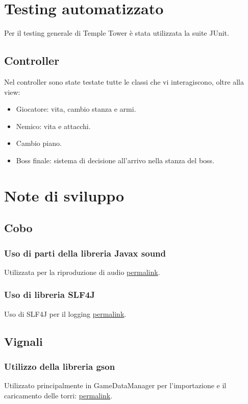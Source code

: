 \documentclass[a4paper,12pt]{report}
\begin{document}
\section{Testing automatizzato}
Per il testing generale di Temple Tower è stata utilizzata la suite JUnit.
\subsection*{Controller}
Nel controller sono state testate tutte le classi che vi interagiscono, oltre alla view:
\begin{itemize}
 \item Giocatore: vita, cambio stanza e armi.
 \item Nemico: vita e attacchi.
 \item Cambio piano.
 \item Boss finale: sistema di decisione all'arrivo nella stanza del boss.
\end{itemize}

\section{Note di sviluppo}

\subsection{Cobo}
\subsubsection{Uso di parti della libreria Javax sound}
Utilizzata per la riproduzione di audio \href{https://github.com/Matt2309/OOP24-temple-tower/blob/297b37062035f41c3e9258656beace208905a368/src/main/java/it/unibo/templetower/controller/MusicController.java#L82C1-L84C15}{permalink}.
\subsubsection{Uso di libreria SLF4J}
Uso di SLF4J per il logging \href{https://github.com/Matt2309/OOP24-temple-tower/blob/297b37062035f41c3e9258656beace208905a368/src/main/java/it/unibo/templetower/controller/MusicController.java#L64C1-L64C75}{permalink}.

\subsection{Vignali}
\subsubsection{Utilizzo della libreria gson}
Utilizzato principalmente in GameDataManager per l'importazione e il caricamento delle torri: \href{https://github.com/Matt2309/OOP24-temple-tower/blob/297b37062035f41c3e9258656beace208905a368/src/main/java/it/unibo/templetower/controller/GameDataManagerImpl.java#L52C1-L67C14}{permalink}.
\end{document}
